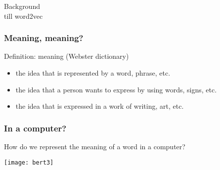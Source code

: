 \begin{frame}[fragile]\frametitle{}
\begin{center}
{\Large Background}\\

{till word2vec}

\end{center}
\end{frame}

\begin{frame}[fragile]\frametitle{Meaning, meaning?}
Definition: meaning (Webster dictionary)

\begin{itemize}
\item the idea that is represented by a word, phrase, etc.
\item the idea that a person wants to express by using  words, signs, etc.
\item the idea that is expressed in a work of writing, art, etc.  
\end{itemize}




\end{frame}


\begin{frame}[fragile]\frametitle{In a computer?}

How do we represent the meaning of a word in a computer?

\begin{center}
\texttt{[image: bert3]}
\end{center}		  


\end{frame}


